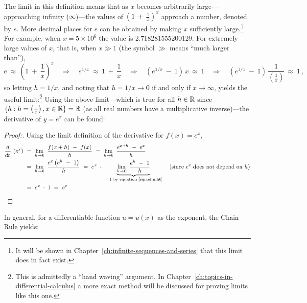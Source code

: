 The limit in this definition means that as $x$ becomes arbitrarily large---approaching
infinity ($\infty$)---the values of $\left( 1 ~+~ \frac{1}{x} \right)^x$
approach a number, denoted by $e$. More decimal places for $e$ can be obtained
by making $x$ sufficiently large.\footnote{It will be shown in Chapter~\ref{ch:infinite-sequences-and-series} that
this limit does in fact exist.} For example, when $x=5 \times 10^6$ the value is
2.718281555200129. For extremely large values of $x$, that
is, when $x \gg 1$ (the symbol $\gg$ means ``much larger than''),\index{$\gg$}
\begin{displaymath}
 e ~\approx~ \left( 1 ~+~ \frac{1}{x} \right)^x \quad\Rightarrow\quad
 e^{1/x} ~\approx~
 1 ~+~ \frac{1}{x} \quad\Rightarrow\quad \left(e^{1/x} ~-~ 1\right)\,x ~\approx~
 1 \quad\Rightarrow\quad \left(e^{1/x} ~-~ 1\right)\,\frac{1}{\left(\frac{1}{x}\right)} ~\approx~
 1 ~,
\end{displaymath}
so letting $h = 1/x$, and noting that $h = 1/x \to 0$ if and only if
$x \to \infty$, yields the useful limit:\footnote{This is admittedly a
``hand waving'' argument. In Chapter~\ref{ch:topics-in-differential-calculus} a more exact method will be discussed for
proving limits like this one.}
Using the above limit---which is true for all $h \in \mathbb{R}$ since
$\lbrace h: h = \left(\frac{1}{x}\right), x \in \mathbb{R} \rbrace = \mathbb{R}$ (as all real
numbers have a multiplicative inverse)---the derivative of $y = e^x$
can be found:
\begin{proofbar}\vspace{-3mm}\begin{proof}[Proof:]
Using the limit definition of the derivative for $f(x) = e^x$,
\begin{align*}
 \frac{d}{d\!x}\,\left(e^x\right) ~&=~ \lim_{h \to 0} ~\frac{f(x+h) ~-~ f(x)}{h}
  ~=~ \lim_{h \to 0} ~\frac{e^{x+h} ~-~ e^x}{h}\\
 &=~ \lim_{h \to 0} ~\frac{e^x \left(e^h ~-~ 1\right)}{h}
 ~=~ e^x \;\cdot\; \underbrace{\lim_{h \to 0}~\frac{e^h ~-~ 1}{h}}_\text{= 1 by equation~\ref{eqn:elimh0}}
     \quad\text{(since $e^x$ does not depend on $h$)}\\
 &=~ e^x \;\cdot\; 1 ~=~ e^x
\end{align*}
\vspace{-3mm}
\end{proof}\end{proofbar}
In general, for a differentiable function $u = u(x)$ as the exponent, the
Chain Rule yields:

